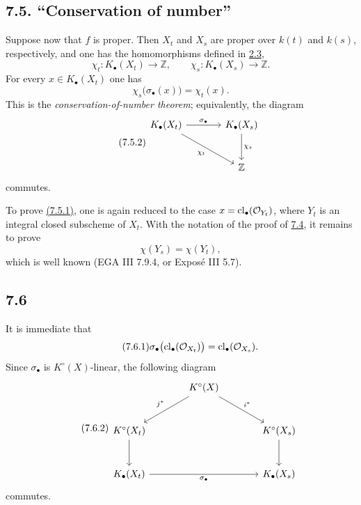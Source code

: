 \subsection*{7.5. ``Conservation of number''}
Suppose now that $f$ is proper. Then $X_t$ and $X_s$ are proper over
$k(t)$ and $k(s)$, respectively, and one has the homomorphisms defined in
\hyperlink{sga6.e10.sec.2.3}{2.3},
\[
\chi_t:K_\bullet(X_t)\longrightarrow\mathbb Z,
\qquad
\chi_s:K_\bullet(X_s)\longrightarrow\mathbb Z.
\]
For every $x\in K_\bullet(X_t)$ one has
\begin{equation}\tag{7.5.1}
\chi_s\bigl(\sigma_\bullet(x)\bigr)=\chi_t(x).
\end{equation}
This is the \emph{conservation-of-number theorem}; equivalently, the diagram
\begin{equation}\tag{7.5.2}
\begin{tikzcd}[column sep=large,row sep=large]
K_\bullet(X_t) \arrow[r,"\sigma_\bullet"] \arrow[dr,"\chi_t"'] &
K_\bullet(X_s) \arrow[d,"\chi_s"]\\
& \mathbb Z
\end{tikzcd}
\end{equation}
commutes.

To prove \hyperlink{sga6.e10.eq.7-5-1}{(7.5.1)}, one is again reduced to the case
$x=\operatorname{cl}_\bullet(\mathcal O_{Y_t})$, where $Y_t$ is an integral closed
subscheme of $X_t$. With the notation of the proof of \hyperlink{sga6.e10.sec.7.4}{7.4}, it remains to
prove
\[
\chi(Y_s)=\chi(Y_t),
\]
which is well known (EGA III 7.9.4, or Expos\'e III 5.7).

\subsection*{7.6}
It is immediate that
\begin{equation}\tag{7.6.1}
\sigma_\bullet\bigl(\operatorname{cl}_\bullet(\mathcal O_{X_t})\bigr)
=\operatorname{cl}_\bullet(\mathcal O_{X_s}).
\end{equation}
Since $\sigma_\bullet$ is $K^\circ(X)$-linear, the following diagram
\begin{equation}\tag{7.6.2}
\begin{tikzcd}[column sep=large,row sep=large]
& K^\circ(X) \arrow[dl,"j^*"'] \arrow[dr,"i^*"] &\\
K^\circ(X_t) \arrow[d] && K^\circ(X_s) \arrow[d]\\
K_\bullet(X_t) \arrow[rr,"\sigma_\bullet"'] && K_\bullet(X_s)
\end{tikzcd}
\end{equation}
commutes.

